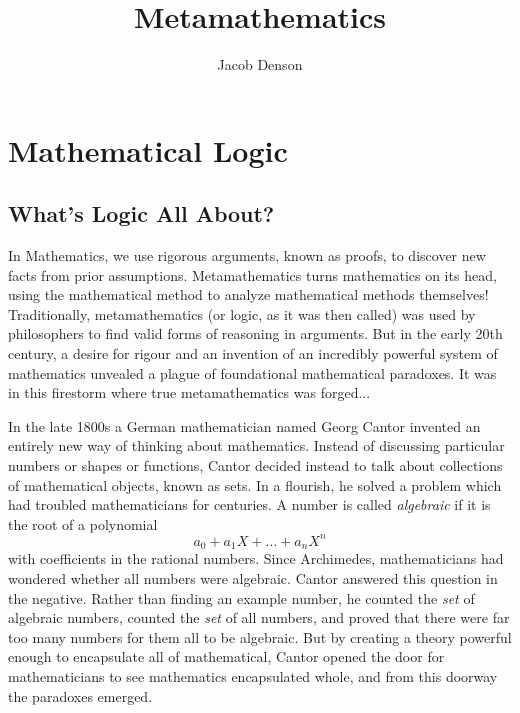 

\title{Metamathematics}
\author{Jacob Denson}



\maketitle
\tableofcontents

\part{Mathematical Logic}

\chapter{What's Logic All About?}


In Mathematics, we use rigorous arguments, known as proofs, to discover new facts from prior assumptions. Metamathematics turns mathematics on its head, using the mathematical method to analyze mathematical methods themselves! Traditionally, metamathematics (or logic, as it was then called) was used by philosophers to find valid forms of reasoning in arguments. But in the early 20th century, a desire for rigour and an invention of an incredibly powerful system of mathematics unvealed a plague of foundational mathematical paradoxes. It was in this firestorm where true metamathematics was forged...

In the late 1800s a German mathematician named Georg Cantor invented an entirely new way of thinking about mathematics. Instead of discussing particular numbers or shapes or functions, Cantor decided instead to talk about collections of mathematical objects, known as sets. In a flourish, he solved a problem which had troubled mathematicians for centuries. A number is called {\it algebraic} if it is the root of a polynomial
%
\[ a_0 + a_1 X + \dots + a_n X^n \]
%
with coefficients in the rational numbers.  Since Archimedes, mathematicians had wondered whether all numbers were algebraic. Cantor answered this question in the negative. Rather than finding an example number, he counted the {\it set} of algebraic numbers, counted the {\it set} of all numbers, and proved that there were far too many numbers for them all to be algebraic. But by creating a theory powerful enough to encapsulate all of mathematical, Cantor opened the door for mathematicians to see mathematics encapsulated whole, and from this doorway the paradoxes emerged.

